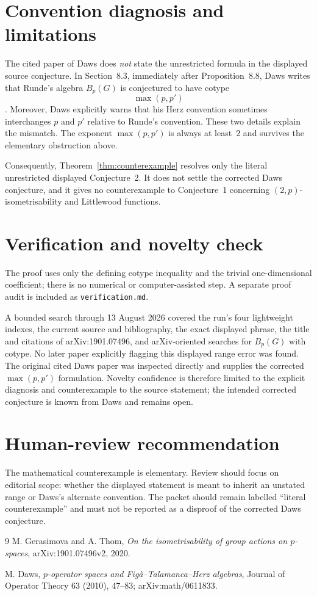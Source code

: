 \documentclass[11pt]{article}
\begin{document}
\section{Convention diagnosis and limitations}

The cited paper of Daws does \emph{not} state the unrestricted formula in
the displayed source conjecture.  In Section~8.3, immediately after
Proposition~8.8, Daws writes that Runde's algebra $B_p(G)$ is conjectured to
have cotype
\[
 \max(p,p')
\]
\cite[p.~74]{daws}.  Moreover, Daws explicitly warns that his Herz convention
sometimes interchanges $p$ and $p'$ relative to Runde's convention.  These
two details explain the mismatch.  The exponent $\max(p,p')$ is always at
least~$2$ and survives the elementary obstruction above.

Consequently, Theorem~\ref{thm:counterexample} resolves only the literal
unrestricted displayed Conjecture~2.  It does not settle the corrected Daws
conjecture, and it gives no counterexample to Conjecture~1 concerning
$(2,p)$-isometrisability and Littlewood functions.

\section{Verification and novelty check}

The proof uses only the defining cotype inequality and the trivial
one-dimensional coefficient; there is no numerical or computer-assisted
step.  A separate proof audit is included as \texttt{verification.md}.

A bounded search through 13 August 2026 covered the run's four lightweight
indexes, the current source and bibliography, the exact displayed phrase,
the title and citations of arXiv:1901.07496, and arXiv-oriented searches for
$B_p(G)$ with cotype.  No later paper explicitly flagging this displayed
range error was found.  The original cited Daws paper was inspected directly
and supplies the corrected $\max(p,p')$ formulation.  Novelty confidence is
therefore limited to the explicit diagnosis and counterexample to the source
statement; the intended corrected conjecture is known from Daws and remains
open.

\section{Human-review recommendation}

The mathematical counterexample is elementary.  Review should focus on
editorial scope: whether the displayed statement is meant to inherit an
unstated range or Daws's alternate convention.  The packet should remain
labelled ``literal counterexample'' and must not be reported as a disproof of
the corrected Daws conjecture.

\begin{thebibliography}{9}
M. Gerasimova and A. Thom,
\emph{On the isometrisability of group actions on $p$-spaces},
arXiv:1901.07496v2, 2020.

M. Daws,
\emph{$p$-operator spaces and Fig\`a--Talamanca--Herz algebras},
Journal of Operator Theory 63 (2010), 47--83;
arXiv:math/0611833.
\end{thebibliography}
\end{document}
